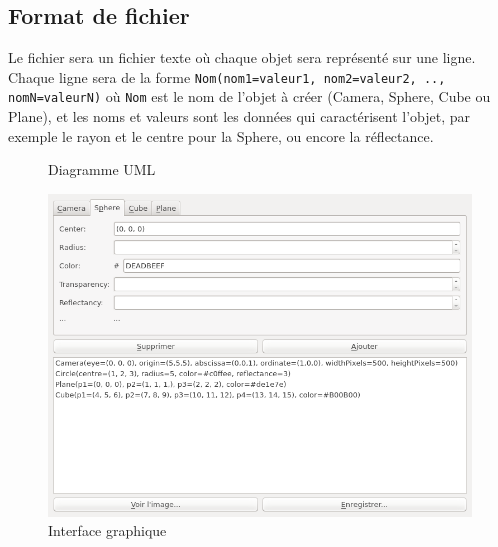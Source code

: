 \documentclass[a4paper]{article}
\begin{document}
  \subsection{Format de fichier}
    Le fichier sera un fichier texte où chaque objet sera représenté sur une
    ligne. Chaque ligne sera de la forme
    \verb+Nom(nom1=valeur1, nom2=valeur2, .., nomN=valeurN)+ où \verb+Nom+ est
    le nom de l'objet à créer (Camera, Sphere, Cube ou Plane), et les noms et
    valeurs sont les données qui caractérisent l'objet, par exemple le rayon
    et le centre pour la Sphere, ou encore la réflectance.

    \begin{landscape}
      \thispagestyle{empty}
      \begin{figure}[p]
        \caption{Diagramme UML\label{fig:uml}}
      \end{figure}
    \end{landscape}
    \restoregeometry

    \begin{figure}[p]
      \centerline{\includegraphics[width=1.2\textwidth]{gui.png}}
    \caption{Interface graphique\label{fig:gui}}
    \end{figure}
\end{document}
